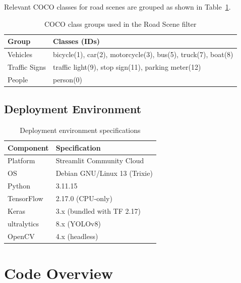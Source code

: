 \documentclass[12pt, a4paper]{article}
\begin{document}
Relevant COCO classes for road scenes are grouped as shown in
Table~\ref{tab:classes}.

\begin{table}[H]
  \centering
  \caption{COCO class groups used in the Road Scene filter}
  \begin{tabular}{ll}
    \toprule
    \textbf{Group} & \textbf{Classes (IDs)} \\
    \midrule
    Vehicles    & bicycle(1), car(2), motorcycle(3), bus(5), truck(7), boat(8) \\
    Traffic Signs & traffic light(9), stop sign(11), parking meter(12) \\
    People      & person(0) \\
    \bottomrule
  \end{tabular}
  \label{tab:classes}
\end{table}

\subsection{Deployment Environment}

\begin{table}[H]
  \centering
  \caption{Deployment environment specifications}
  \begin{tabular}{ll}
    \toprule
    \textbf{Component} & \textbf{Specification} \\
    \midrule
    Platform           & Streamlit Community Cloud \\
    OS                 & Debian GNU/Linux 13 (Trixie) \\
    Python             & 3.11.15 \\
    TensorFlow         & 2.17.0 (CPU-only) \\
    Keras              & 3.x (bundled with TF 2.17) \\
    ultralytics        & 8.x (YOLOv8) \\
    OpenCV             & 4.x (headless) \\
    \bottomrule
  \end{tabular}
  \label{tab:env}
\end{table}

\section{Code Overview}
\end{document}
